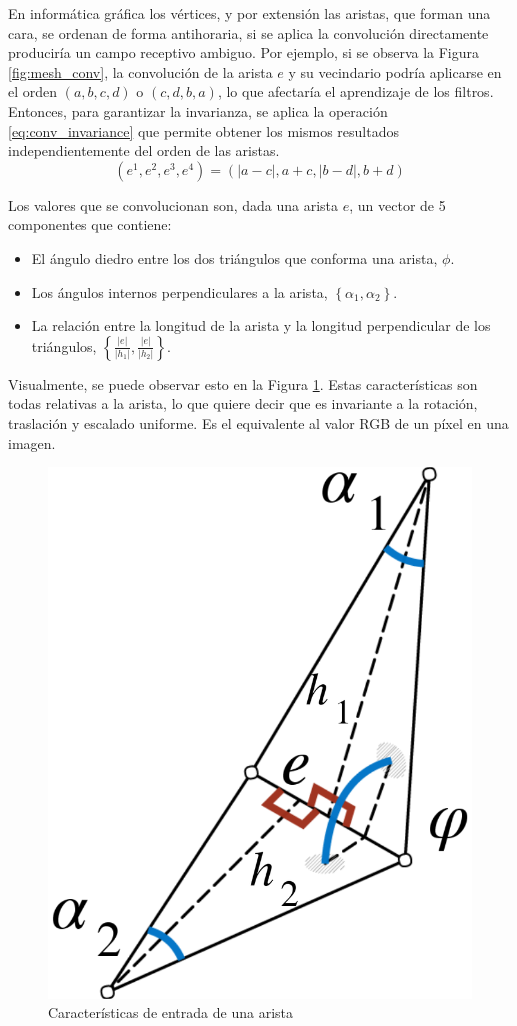 En informática gráfica los vértices, y por extensión las aristas, que forman una cara, se ordenan de forma antihoraria, si se aplica la convolución directamente produciría un campo receptivo ambiguo. Por ejemplo, si se observa la Figura \ref{fig:mesh_conv}, la convolución de la arista $e$ y su vecindario podría aplicarse en el orden $(a,b,c,d)$ o $(c,d,b,a)$, lo que afectaría el aprendizaje de los filtros. Entonces, para garantizar la invarianza, se aplica la operación \ref{eq:conv_invariance} que permite obtener los mismos resultados independientemente del orden de las aristas.
\begin{equation}
\label{eq:conv_invariance}
    (e^1, e^2, e^3, e^4) = (|a-c|, a+c, |b-d|, b+d)
\end{equation}

Los valores que se convolucionan son, dada una arista $e$, un vector de 5 componentes que contiene:
\begin{itemize}
    \item El ángulo diedro entre los dos triángulos que conforma una arista, $\phi$.
    \item Los ángulos internos perpendiculares a la arista, $\left\{\alpha_1, \alpha_2\right\}$.
    \item La relación entre la longitud de la arista y la longitud perpendicular de los triángulos, $\left\{\frac{|e|}{|h_1|}, \frac{|e|}{|h_2|}\right\}.$
\end{itemize}
Visualmente, se puede observar esto en la Figura \ref{fig:edge_feats}. Estas características son todas relativas a la arista, lo que quiere decir que es invariante a la rotación, traslación y escalado uniforme. Es el equivalente al valor RGB de un píxel en una imagen.

\begin{figure}[h]
    \centering
    \includegraphics[width=0.35\linewidth]{imagenes/methods/input_edge_features.png}
    \caption[MeshCNN: Características de una arista]{Características de entrada de una arista}
    \label{fig:edge_feats}
\end{figure}

